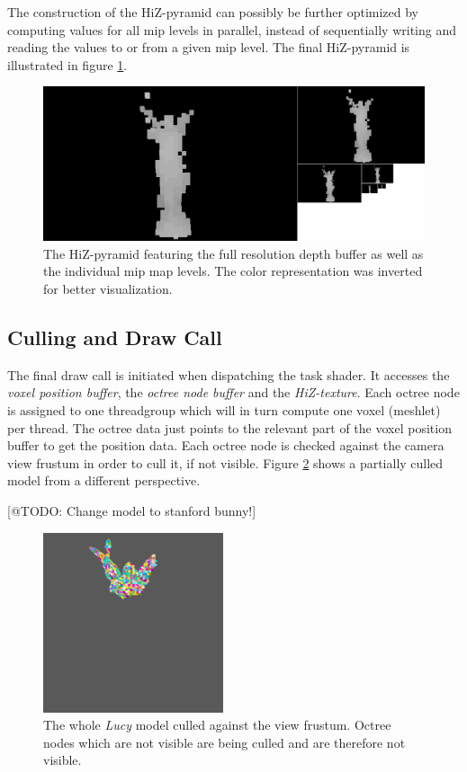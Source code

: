 \noindent
The construction of the \ac{HiZ}-pyramid can possibly be further optimized by computing values for all mip levels 
in parallel, instead of sequentially writing and reading the values to or from a given mip level. 
The final \ac{HiZ}-pyramid is illustrated in figure \ref{fig:lucy-hiz-pyramid}.

\begin{figure}[h]
    \centering
    \includegraphics[width=\linewidth]{images/graphics/lucy-hiz-pyramid-inverted.jpg}
    \caption{The \ac{HiZ}-pyramid featuring the full resolution depth buffer as well as the individual mip map 
    levels. The color representation was inverted for better visualization.}
    \label{fig:lucy-hiz-pyramid}
\end{figure}

\subsection*{Culling and Draw Call}

The final draw call is initiated when dispatching the task shader. It accesses the \emph{voxel position buffer}, 
the \emph{octree node buffer} and the \emph{\ac{HiZ}-texture}. Each octree node is assigned to one threadgroup which will 
in turn compute one voxel (meshlet) per thread. The octree data just points to the relevant part of the voxel position buffer 
to get the position data. Each octree node is checked against the camera view frustum in order to cull it, if not visible.
Figure \ref{fig:lucy-frustum-culling} shows a partially culled model from a different perspective. 

[@TODO: Change model to stanford bunny!]
\begin{figure}[h]
    \centering
    \includegraphics[width=200px]{images/graphics/lucy-frustum-culling.jpg}
    \caption{The whole \emph{Lucy} model culled against the view frustum. Octree nodes which are not visible are being 
    culled and are therefore not visible.}
    \label{fig:lucy-frustum-culling}
\end{figure}


